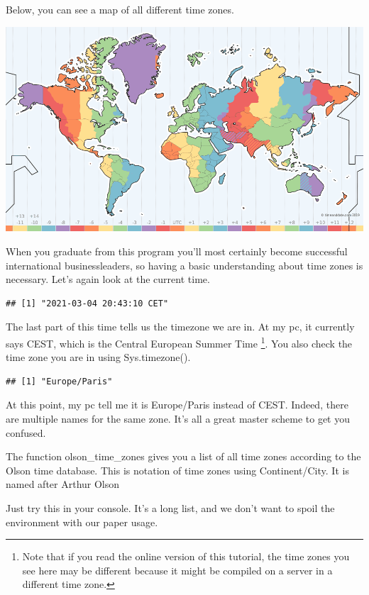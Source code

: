 \documentclass[]{tufte-book}
\begin{document}
Below, you can see a map of all different time zones.

\begin{center}\includegraphics[width=1\linewidth]{images/timezones} \end{center}

When you graduate from this program you'll most certainly become successful international businessleaders, so having a basic understanding about time zones is necessary. Let's again look at the current time.

\begin{verbatim}
## [1] "2021-03-04 20:43:10 CET"
\end{verbatim}

The last part of this time tells us the timezone we are in. At my pc, it currently says CEST, which is the Central European Summer Time \footnote{Note that if you read the online version of this tutorial, the time zones you see here may be different because it might be compiled on a server in a different time zone.}. You also check the time zone you are in using Sys.timezone().

\begin{verbatim}
## [1] "Europe/Paris"
\end{verbatim}

At this point, my pc tell me it is Europe/Paris instead of CEST. Indeed, there are multiple names for the same zone. It's all a great master scheme to get you confused.

The function olson\_time\_zones gives you a list of all time zones according to the Olson time database. This is notation of time zones using Continent/City. It is named after Arthur Olson

Just try this in your console. It's a long list, and we don't want to spoil the environment with our paper usage.
\end{document}
